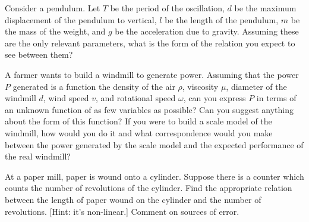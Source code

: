 \documentclass[12pt]{article}
\newenvironment{exercise}[2][Exercise]{\begin{trivlist}
\item[\hskip \labelsep {\bfseries #1}\hskip \labelsep {\bfseries #2.}]}{\end{trivlist}}
\begin{document}
\begin{exercise}{2}
Consider a pendulum. Let $T$ be the period of the oscillation, $d$ be the maximum displacement of the pendulum to vertical, $l$ be the length of the pendulum, $m$ be the mass of the weight, and $g$ be the acceleration due to gravity. Assuming these are the only relevant parameters, what is the form of the relation you expect to see between them?
\end{exercise}

\begin{exercise}{3}
A farmer wants to build a windmill to generate power. Assuming that the power $P$
generated is a function the density of the air $\rho$, viscosity $\mu$, diameter of the windmill $d$, wind speed $v$, and rotational speed $\omega$, can you express $P$ in terms of an unknown function of as few variables as possible? Can you suggest anything about the form of this function? If you were to build a scale model of the windmill, how would you do it and what correspondence would you make between the power generated by the scale model and the expected performance of the real windmill?
\end{exercise}

\begin{exercise}{4}
At a paper mill, paper is wound onto a cylinder. Suppose there is a counter which counts the number of revolutions of the cylinder. Find the appropriate relation between the length of paper wound on the cylinder and the number of revolutions. [Hint: it’s non-linear.] Comment on sources of error.
\end{exercise}

 
\end{document}
